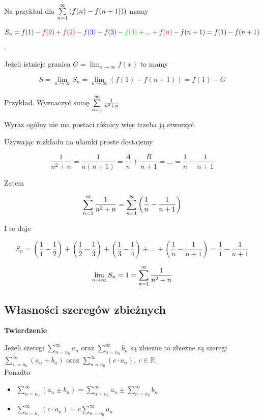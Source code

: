 Na przykład dla $ \sum\limits_{n = 1}^{\infty} \left( f(n) - f(n + 1)) \right) $ mamy

$$ S_n = f(1) - \textcolor{red}{f(2)} + \textcolor{red}{f(2)} - \textcolor{blue}{f(3)} + \textcolor{blue}{f(3)} - 
\textcolor{green}{f(4)} + ... + \textcolor{purple}{f(n)} - f(n + 1) = f(1) - f(n + 1) $$.

Jeżeli istnieje granica $ G = \lim_{x \to \infty} f(x) $ to mamy

$$ S = \lim_{n \to \infty} S_n = \lim_{n \to \infty} \left( f(1) - f(n + 1) \right) = f(1) - G $$ \\

Przykład. Wyznaczyć sumę $ \sum\limits_{n = 1}^{\infty} \frac{1}{n^2 + n} $

Wyraz ogólny nie ma postaci różnicy więc trzeba ją stworzyć.

Używając rozkładu na ułamki proste dostajemy

$$ \frac{1}{n^2 + n} = \frac{1}{n(n+1)} = \frac{A}{n} + \frac{B}{n+1} = ... = \frac{1}{n} - \frac{1}{n+1} $$

Zatem 

$$ \sum\limits_{n = 1}^{\infty} \frac{1}{n^2 + n} = \sum\limits_{n=1}^{\infty} \left( \frac{1}{n} - \frac{1}{n+1} \right) $$

I to daje

$$ S_n = \left( \frac{1}{1} - \frac{1}{2} \right) + \left( \frac{1}{2} - \frac{1}{3} \right) + \left( \frac{1}{3} - \frac{1}{4} \right)
+ ... + \left( \frac{1}{n} - \frac{1}{n+1} \right) = \frac{1}{1} - \frac{1}{n+1}  $$ 

$$ \lim_{n \to \infty} S_n = 1 = \sum\limits_{n = 1}^{\infty} \frac{1}{n^2 + n} $$

\subsection*{Własności szeregów zbieżnych}

\textbf{Twierdzenie}

Jeżeli szeregi $ \sum\limits_{n = n_0}^{\infty} a_n $ oraz $ \sum\limits_{n = n_0}^{\infty} b_n $ są zbieżne to zbieżne są szeregi
$ \sum\limits_{n = n_0}^{\infty} (a_n + b_n) $ \linebreak oraz $ \sum\limits_{n = n_0}^{\infty} (c \cdot a_n), \ c \in \mathbb{R} $. \\

Ponadto

\begin{itemize}
    \item $ \sum\limits_{n = n_0}^{\infty} (a_n \pm b_n) = \sum\limits_{n = n_0}^{\infty} a_n \pm \sum\limits_{n = n_0}^{\infty} b_n $
    \item $ \sum\limits_{n = n_0}^{\infty} (c \cdot a_n) = c \sum\limits_{n = n_0}^{\infty} a_n $ \\
\end{itemize}


